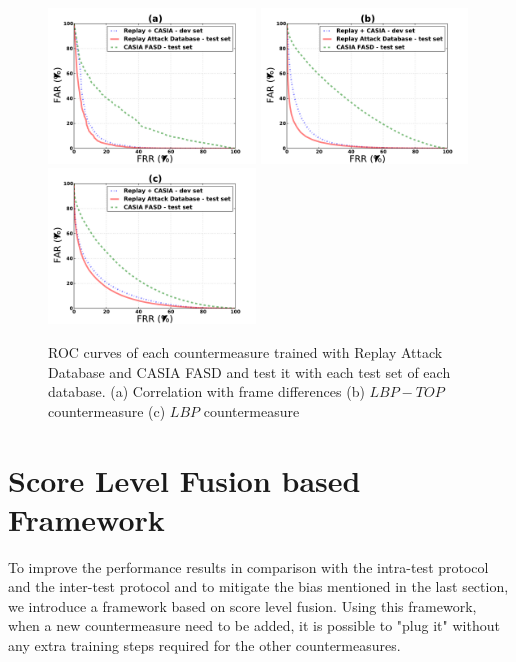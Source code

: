 \begin{figure}[ht]
\begin{center}

\includegraphics [width=5.5cm] {plots/ALL/MOTION.pdf} 
\includegraphics [width=5.5cm] {plots/ALL/LBPTOP.pdf}
\includegraphics [width=5.5cm] {plots/ALL/LBP.pdf}

\caption{ROC curves of each countermeasure trained with Replay Attack Database and CASIA FASD and test it with each test set of each database. (a) Correlation with frame differences (b) $LBP-TOP$ countermeasure (c) $LBP$ countermeasure} 
\label{fig:ROC_cross}
\end{center}
\end{figure}


\section{Score Level Fusion based Framework}
\label{sec:framework}

To improve the performance results in comparison with the intra-test protocol and the inter-test protocol and to mitigate the bias mentioned in the last section, we introduce a framework based on score level fusion. Using this framework, when a new countermeasure need to be added, it is possible to "plug it" without any extra training steps required for the other countermeasures.

